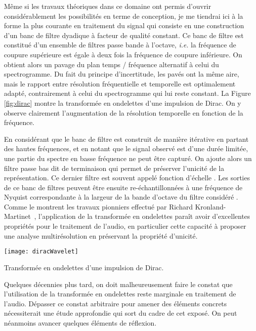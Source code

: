 Même si les travaux théoriques dans ce domaine ont permis d'ouvrir considérablement les possibilités en terme de conception, je me  tiendrai ici à la forme la plus courante en traitement du signal qui consiste en une construction d'un banc de filtre dyadique à facteur de qualité constant. Ce banc de filtre est constitué d'un ensemble de filtres passe bande à l'octave, \textit{i.e.} la fréquence de coupure supérieure est égale à deux fois la fréquence de coupure inférieure. On obtient alors un pavage du plan temps / fréquence alternatif à celui du spectrogramme. Du fait du principe d'incertitude, les pavés ont la même aire, mais le rapport entre résolution fréquentielle et temporelle est optimalement adapté, contrairement à celui du spectrogramme qui lui reste constant. La Figure \ref{fig:dirac} montre la transformée en ondelettes d'une impulsion de Dirac. On y  observe clairement l'augmentation de la résolution temporelle en fonction de la fréquence.

En considérant que le banc de filtre est construit de manière itérative en partant des hautes fréquences, et en notant que le signal observé est d'une durée limitée, une partie du spectre en basse fréquence ne peut être capturé. On ajoute alors un filtre passe bas dit \og de terminaison \fg qui permet de préserver l'unicité de la représentation. Ce dernier filtre est souvent appelé \og fonction d'échelle \fg. Les sorties de ce banc de filtres peuvent être ensuite re-échantillonnées à une fréquence de Nyquist correspondante à la largeur de la bande d'octave du filtre considéré%
. Comme le montrent les travaux pionniers effectué par Richard Kronland-Martinet~\cite{kronland1987analysis}, l'application de la transformée en ondelettes paraît avoir d'excellentes propriétés pour le traitement de l'audio, en particulier cette capacité à proposer une analyse multirésolution en préservant la propriété d'unicité.

\begin{marginfigure}
  \texttt{[image: diracWavelet]}
  \caption{Transformée en ondelettes d'une impulsion de Dirac.}
  \label{fig:dirac}
\end{marginfigure}

Quelques décennies plus tard, on doit malheureusement faire le constat que l'utilisation de la transformée en ondelettes reste marginale en traitement de l'audio. Dépasser ce constat arbitraire pour amener des éléments concrets nécessiterait une étude approfondie qui sort du cadre de cet exposé. On peut néanmoins avancer quelques éléments de réflexion.

